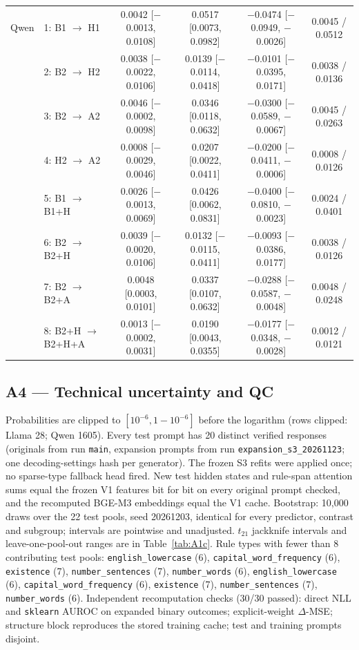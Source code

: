 \documentclass{article}
\newcommand{\cto}{$\rightarrow$}
\begin{document}
\begin{table}[h]
{\begin{tabular}{llcccc}
\midrule
Qwen & 1: B1 \cto{} H1 & 0.0042 [$-$0.0013, 0.0108] & 0.0517 [0.0073, 0.0982] & $-$0.0474 [$-$0.0949, $-$0.0026] & 0.0045 / 0.0512 \\
 & 2: B2 \cto{} H2 & 0.0038 [$-$0.0022, 0.0106] & 0.0139 [$-$0.0114, 0.0418] & $-$0.0101 [$-$0.0395, 0.0171] & 0.0038 / 0.0136 \\
 & 3: B2 \cto{} A2 & 0.0046 [$-$0.0002, 0.0098] & 0.0346 [0.0118, 0.0632] & $-$0.0300 [$-$0.0589, $-$0.0067] & 0.0045 / 0.0263 \\
 & 4: H2 \cto{} A2 & 0.0008 [$-$0.0029, 0.0046] & 0.0207 [0.0022, 0.0411] & $-$0.0200 [$-$0.0411, $-$0.0006] & 0.0008 / 0.0126 \\
 & 5: B1 \cto{} B1+H & 0.0026 [$-$0.0013, 0.0069] & 0.0426 [0.0062, 0.0831] & $-$0.0400 [$-$0.0810, $-$0.0023] & 0.0024 / 0.0401 \\
 & 6: B2 \cto{} B2+H & 0.0039 [$-$0.0020, 0.0106] & 0.0132 [$-$0.0115, 0.0411] & $-$0.0093 [$-$0.0386, 0.0177] & 0.0038 / 0.0126 \\
 & 7: B2 \cto{} B2+A & 0.0048 [0.0003, 0.0101] & 0.0337 [0.0107, 0.0632] & $-$0.0288 [$-$0.0587, $-$0.0048] & 0.0048 / 0.0248 \\
 & 8: B2+H \cto{} B2+H+A & 0.0013 [$-$0.0002, 0.0031] & 0.0190 [0.0043, 0.0355] & $-$0.0177 [$-$0.0348, $-$0.0028] & 0.0012 / 0.0121 \\
\bottomrule
\end{tabular}
}
\end{table}

\subsection*{A4 --- Technical uncertainty and QC}
Probabilities are clipped to $[10^{-6}, 1-10^{-6}]$ before the logarithm (rows clipped: Llama 28; Qwen 1605). Every test prompt has 20 distinct verified responses (originals from run \texttt{main}, expansion prompts from run \texttt{expansion\_s3\_20261123}; one decoding-settings hash per generator). The frozen S3 refits were applied once; no sparse-type fallback head fired. New test hidden states and rule-span attention sums equal the frozen V1 features bit for bit on every original prompt checked, and the recomputed BGE-M3 embeddings equal the V1 cache. Bootstrap: 10,000 draws over the 22 test pools, seed 20261203, identical for every predictor, contrast and subgroup; intervals are pointwise and unadjusted. $t_{21}$ jackknife intervals and leave-one-pool-out ranges are in Table~\ref{tab:A1c}. Rule types with fewer than 8 contributing test pools: \texttt{english\_lowercase} (6), \texttt{capital\_word\_frequency} (6), \texttt{existence} (7), \texttt{number\_sentences} (7), \texttt{number\_words} (6), \texttt{english\_lowercase} (6), \texttt{capital\_word\_frequency} (6), \texttt{existence} (7), \texttt{number\_sentences} (7), \texttt{number\_words} (6). Independent recomputation checks (30/30 passed): direct NLL and \texttt{sklearn} AUROC on expanded binary outcomes; explicit-weight $\Delta$-MSE; structure block reproduces the stored training cache; test and training prompts disjoint.
\end{document}
